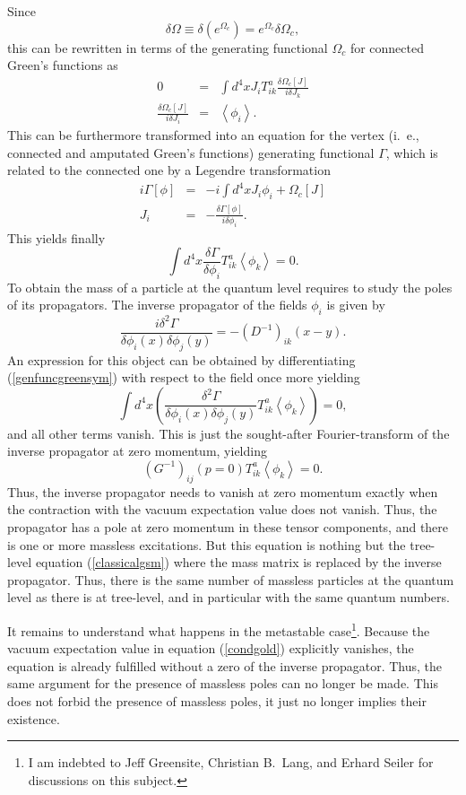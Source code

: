 \documentclass[final,12pt,3p,longtitle]{elsarticle}
\newcommand*{\no}{\noindent}
\newcommand*{\bea}{\begin{eqnarray}}
\newcommand*{\eea}{\end{eqnarray}}
\newcommand*{\be}{\begin{equation}}
\newcommand*{\ee}{\end{equation}}
\newcommand*{\pref}[1]{(\ref{#1})}
\newcommand*{\nn}{\nonumber}
\newcommand*{\1}{1\!\!\!\bot}
\newcommand*{\la}{\left\langle}
\newcommand*{\ra}{\right\rangle}
\begin{document}
Since
\be
\delta \Omega\equiv\delta\left(e^{\Omega_c}\right)=e^{\Omega_c}\delta \Omega_c\nn,
\ee
\no this can be rewritten in terms of the generating functional $\Omega_c$ for connected Green's functions as
\bea
0&=&\int d^4x J_i T_{ik}^a\frac{\delta \Omega_c[J]}{i\delta J_k}\nn\\
\frac{\delta \Omega_c[J]}{i\delta J_i}&=&\la\phi_i\ra\nn.
\eea
\no This can be furthermore transformed into an equation for the vertex (i.\ e., connected and amputated Green's functions) generating functional $\Gamma$, which is related to the connected one by a Legendre transformation
\bea
i\Gamma[\phi]&=&-i\int d^4 x J_i\phi_i+\Omega_c[J]\nn\\
J_i&=&-\frac{\delta\Gamma[\phi]}{i\delta\phi_i}\label{legendre}.
\eea
\no This yields finally
\be
\int d^4x\frac{\delta\Gamma}{\delta\phi_i} T_{ik}^a\la\phi_k\ra=0\label{genfuncgreensym}.
\ee
\no To obtain the mass of a particle at the quantum level requires to study the poles of its propagators. The inverse propagator of the fields $\phi_i$ is given by
\be
\frac{i\delta^2\Gamma}{\delta\phi_i(x)\delta\phi_j(y)}=-(D^{-1})_{ik}(x-y).
\ee
\no An expression for this object can be obtained by differentiating \pref{genfuncgreensym} with respect to the field once more yielding \cite{Bohm:2001yx}
\be
\int d^4x\left(\frac{\delta^2\Gamma}{\delta\phi_i(x)\delta\phi_j(y)}T_{ik}^a\la\phi_k\ra\right)=0\nn,
\ee
\no and all other terms vanish. This is just the sought-after Fourier-transform of the inverse propagator at zero momentum, yielding
\be
(G^{-1})_{ij}(p=0)T_{ik}^a\la\phi_k\ra=0\label{condgold}.
\ee
\no Thus, the inverse propagator needs to vanish at zero momentum exactly when the contraction with the vacuum expectation value does not vanish. Thus, the propagator has a pole at zero momentum in these tensor components, and there is one or more massless excitations. But this equation is nothing but the tree-level equation \pref{classicalgsm} where the mass matrix is replaced by the inverse propagator. Thus, there is the same number of massless particles at the quantum level as there is at tree-level, and in particular with the same quantum numbers.

It remains to understand what happens in the metastable case\footnote{I am indebted to Jeff Greensite, Christian B.\ Lang, and Erhard Seiler for discussions on this subject.}. Because the vacuum expectation value in equation \pref{condgold} explicitly vanishes, the equation is already fulfilled without a zero of the inverse propagator. Thus, the same argument for the presence of massless poles can no longer be made. This does not forbid the presence of massless poles, it just no longer implies their existence.
\end{document}

